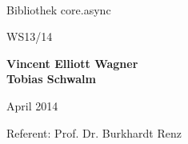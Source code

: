 \thispagestyle{empty}

\begin{center}


{\Huge \thetitle}\\

\vspace{20mm}
\begin{huge}
Bibliothek core.async
\end{huge}
\vspace{15mm}

\begin{Large}
WS13/14
\end{Large}

\vspace{15mm}
\begin{Large}
\textbf{Vincent Elliott Wagner}\\
\textbf{Tobias Schwalm}\\
\end{Large}
\vspace{15mm}
\begin{large}
April 2014
\end{large}

\vspace{15mm}
\begin{large}
Referent: Prof. Dr. Burkhardt Renz\\
\end{large}

\end{center}